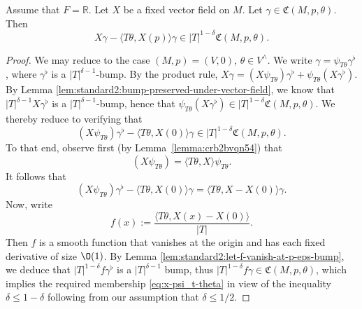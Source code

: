 \begin{lemma}\label{lem:archimedean-vector-field-act-on-C}
  Assume that $F = \mathbb{R}$.  Let $X$ be a fixed vector field on $M$.  Let $\gamma \in \mathfrak{C}(M,p,\theta)$.  Then
  \begin{equation*}
    X \gamma - \langle T \theta, X(p) \rangle \gamma
    \in
    |T|^{1-\delta}
    \mathfrak{C}(M,p,\theta).
  \end{equation*}
\end{lemma}
\begin{proof}
  We may reduce to the case $(M,p) = (V,0)$, $\theta \in V^\wedge$.  We write $\gamma = \psi_{T \theta} \gamma^{\flat}$, where $\gamma^{\flat}$ is a $|T|^{\delta-1}$-bump.  By the product rule, $X \gamma = (X \psi_{T \theta}) \gamma^{\flat} + \psi_{T \theta} (X \gamma^{\flat})$.  By Lemma \ref{lem:standard2:bump-preserved-under-vector-field}, we know that $|T|^{\delta - 1} X  \gamma^{\flat}$ is a $|T|^{\delta-1}$-bump, hence that $\psi_{T \theta} (X \gamma^{\flat}) \in |T|^{1- \delta} \mathfrak{C}(M,p,\theta)$.  We thereby reduce to verifying that
  \begin{equation}\label{eq:x-psi_t-theta}
    (X \psi_{T \theta}) \gamma^{\flat} - \langle T \theta, X(0) \rangle \gamma \in |T|^{1-\delta} \mathfrak{C}(M,p,\theta).
  \end{equation}
  To that end, observe first (by Lemma~\ref{lemma:crb2bvqn54}) that
  \begin{equation*}
    (X \psi_{T \theta}) = \langle T \theta, X \rangle \psi_{T \theta}.
  \end{equation*}
  It follows that
  \begin{equation*}
    (X \psi_{T \theta}) \gamma^{\flat} - \langle T \theta, X(0) \rangle \gamma
    =
    \langle
    T \theta, X - X(0)
    \rangle
    \gamma.
  \end{equation*}
  Now, write
  \begin{equation*}
    f(x) :=
    \frac{
      \langle
      T \theta, X(x) - X(0)
      \rangle
    }{
      |T|
    }.
  \end{equation*}
  Then $f$ is a smooth function that vanishes at the origin and has each fixed derivative of size $\O(1)$.  By Lemma \ref{lem:standard2:let-f-vanish-at-p-eps-bump}, we deduce that $|T|^{1 - \delta} f \gamma^{\flat}$ is a $|T|^{\delta-1}$ bump, thus $|T|^{1- \delta} f \gamma \in \mathfrak{C}(M,p,\theta)$, which implies the required membership \eqref{eq:x-psi_t-theta} in view of the inequality $\delta \leq 1 - \delta$ following from our assumption that $\delta \leq 1/2$.
\end{proof}



